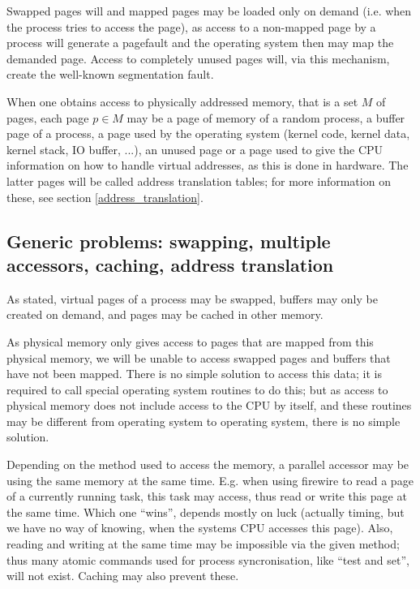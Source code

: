 Swapped pages will and mapped pages may be loaded only on demand (i.e. when the
process tries to access the page), as access to a non-mapped page by a process
will generate a pagefault and the operating system then may map the demanded
page.  Access to completely unused pages will, via this mechanism, create the
well-known segmentation fault.

When one obtains access to physically addressed memory, that is a set $M$ of
pages, each page $p \in M$ may be a page of memory of a random process, a buffer
page of a process, a page used by the operating system (kernel code, kernel
data, kernel stack, IO buffer, ...), an unused page or a page used to give the
CPU information on how to handle virtual addresses, as this is done in hardware.
The latter pages will be called address translation tables; for more information
on these, see section \ref{address_translation}.

\subsection{Generic problems: swapping, multiple accessors, caching, address
translation}

As stated, virtual pages of a process may be swapped, buffers may only be
created on demand, and pages may be cached in other memory.

As physical memory only gives access to pages that are mapped from this
physical memory, we will be unable to access swapped pages and buffers that
have not been mapped. There is no simple solution to access this data; it is
required to call special operating system routines to do this; but as access to
physical memory does not include access to the CPU by itself, and these
routines may be different from operating system to operating system, there is
no simple solution.

Depending on the method used to access the memory, a parallel accessor may be
using the same memory at the same time. E.g. when using firewire to read a page
of a currently running task, this task may access, thus read or write this page
at the same time. Which one ``wins'', depends mostly on luck (actually timing,
but we have no way of knowing, when the systems CPU accesses this page). Also,
reading and writing at the same time may be impossible via the given method;
thus many atomic commands used for process syncronisation, like ``test and
set'', will not exist.  Caching may also prevent these.

